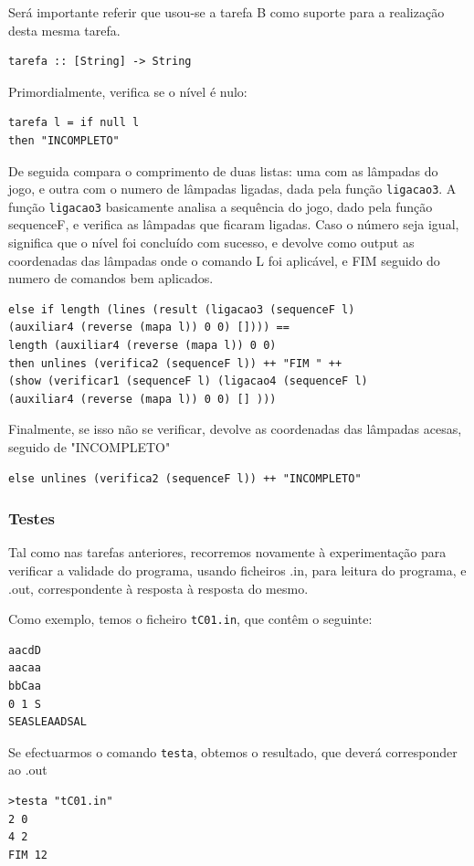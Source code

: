 \documentclass[a4paper]{article}
\begin{document}
Será importante referir que usou-se a tarefa B como suporte para a realização desta mesma tarefa.


\begin{lstlisting}[frame=single]
tarefa :: [String] -> String
\end{lstlisting}

Primordialmente, verifica se o nível é nulo:
\begin{lstlisting}[frame=single]
tarefa l = if null l 
then "INCOMPLETO"
\end{lstlisting}

De seguida compara o comprimento de duas listas: uma com as lâmpadas do jogo, e outra com o
numero de lâmpadas ligadas, dada pela função \verb|ligacao3|.
A função \verb|ligacao3| basicamente analisa a sequência do jogo, dado pela função sequenceF, e verifica as lâmpadas que ficaram ligadas. Caso o número seja igual, significa que o nível foi concluído com sucesso, e devolve como output as coordenadas das lâmpadas onde o comando L foi aplicável, e FIM seguido do numero de comandos bem aplicados.
\begin{lstlisting}[frame=single]
else if length (lines (result (ligacao3 (sequenceF l) 
(auxiliar4 (reverse (mapa l)) 0 0) []))) == 
length (auxiliar4 (reverse (mapa l)) 0 0)
then unlines (verifica2 (sequenceF l)) ++ "FIM " ++ 
(show (verificar1 (sequenceF l) (ligacao4 (sequenceF l) 
(auxiliar4 (reverse (mapa l)) 0 0) [] )))
\end{lstlisting}

Finalmente, se isso não se verificar, devolve as coordenadas das lâmpadas acesas, seguido de "INCOMPLETO"
\begin{lstlisting}[frame=single] 
else unlines (verifica2 (sequenceF l)) ++ "INCOMPLETO" 
\end{lstlisting}

\subsubsection{Testes}
Tal como nas tarefas anteriores, recorremos novamente à experimentação para verificar a validade do programa, usando ficheiros .in, para leitura do programa, e .out, correspondente à resposta à resposta do mesmo.

Como exemplo, temos o ficheiro \verb|tC01.in|, que contêm o seguinte:
\begin{verbatim}
aacdD
aacaa
bbCaa
0 1 S
SEASLEAADSAL
\end{verbatim}

Se efectuarmos o comando \verb|testa|, obtemos o resultado, que deverá corresponder ao .out
\begin{verbatim}
>testa "tC01.in"
2 0
4 2
FIM 12
\end{verbatim}
\end{document}
